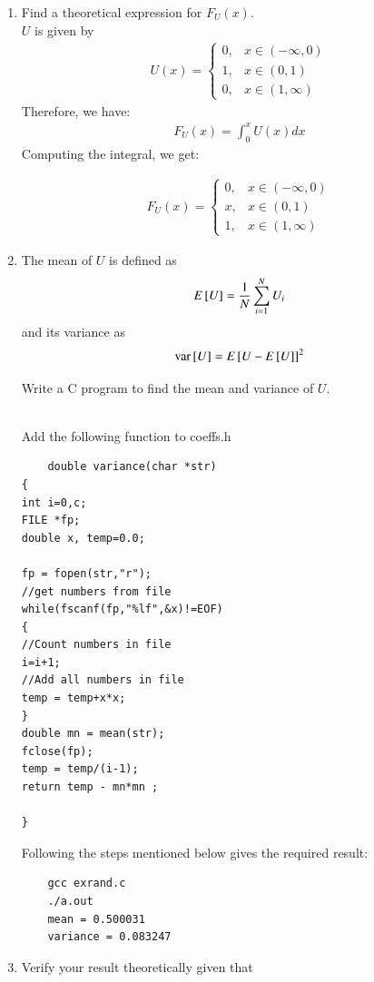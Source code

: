 \documentclass[journal,12pt,twocolumn]{IEEEtran}
\renewcommand\thesection{\arabic{section}}
\begin{document}
\begin{enumerate}[label=\thesection.\arabic*
,ref=\thesection.\theenumi]
%
\item
Find a  theoretical expression for $F_{U}(x)$.
\\
\solution
$U$ is given by 
\begin{align}
    U(x) = 
    \begin{cases}
        0, & x \in (-\infty,0) \\
        1, & x \in (0,1) \\
        0, & x \in (1, \infty)
    \end{cases}
\end{align}
Therefore, we have:
    \begin{align}
        F_U(x) = \int_0^x U(x) dx
    \end{align}
Computing the integral, we get:

\begin{align}
    F_U(x) = 
    \begin{cases}
        0, & x \in (-\infty,0) \\
        x, & x \in (0,1) \\
        1, & x \in (1, \infty)
    \end{cases}
\end{align}


\item
The mean of $U$ is defined as
%
\begin{equation}
E{}\left[U\right] = \frac{1}{N}\sum_{i=1}^{N}U_i
\end{equation}
%
and its variance as
%
\begin{equation}
\text{var}{}\left[U\right] = E{}\left[U- E{}\left[U\right]\right]^2 
\end{equation}

Write a C program to  find the mean and variance of $U$. 

\\
\solution
Add the following function to coeffs.h
\begin{lstlisting}
    double variance(char *str)
{
int i=0,c;
FILE *fp;
double x, temp=0.0;

fp = fopen(str,"r");
//get numbers from file
while(fscanf(fp,"%lf",&x)!=EOF)
{
//Count numbers in file
i=i+1;
//Add all numbers in file
temp = temp+x*x;
}
double mn = mean(str);
fclose(fp);
temp = temp/(i-1);
return temp - mn*mn ;

}
    \end{lstlisting}

Following the steps mentioned below gives the required result:

\begin{lstlisting}
    gcc exrand.c
    ./a.out
    mean = 0.500031
    variance = 0.083247
\end{lstlisting}






\item Verify your result theoretically given that
\end{enumerate}
\end{document}
